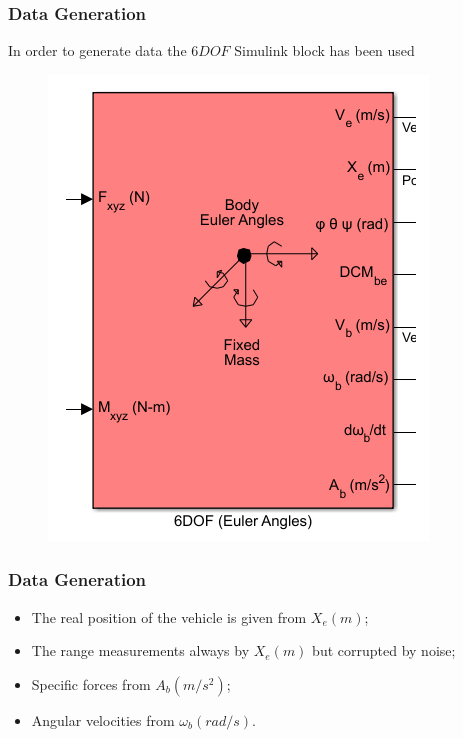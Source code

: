 \documentclass{beamer}
\begin{document}
	\begin{frame}
		\frametitle{Data Generation}
		In order to generate data the $6DOF$ Simulink block has been used
		\begin{figure}[H]
			\includegraphics[scale=0.4]{6DOF}
		\end{figure}
	\end{frame}
	
	\begin{frame}
		\frametitle{Data Generation}
		\begin{itemize}
			\item The real position of the vehicle is given from $X_e(m)$;
			\item The range measurements always by $X_e(m)$ but corrupted by noise;
			\item Specific forces from $A_b(m/s^2)$;
			\item Angular velocities from $\omega_b(rad/s)$.
		\end{itemize}
	\end{frame}
\end{document}
